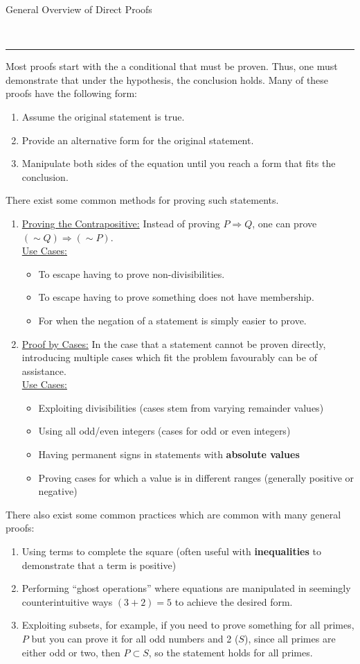 \documentclass{article}
\newcommand{\header}[1]{\begin{large}\noindent #1\end{large}\\\rule{\textwidth}{0.5pt}}
\newcommand{\sheader}[1]{\underline{#1:}}
\newcommand{\sgap}{\smallskip\\}
\begin{document}
\header{General Overview of Direct Proofs}
Most proofs start with the a conditional that must be proven. Thus, one must demonstrate that
under the hypothesis, the conclusion holds. Many of these proofs have the following form:
\begin{enumerate}
    \item Assume the original statement is true.
    \item Provide an alternative form for the original statement.
    \item Manipulate both sides of the equation until you reach a form that fits the conclusion.
\end{enumerate}

There exist some common methods for proving such 
statements.
\begin{enumerate}
    \item \sheader{Proving the Contrapositive} Instead of proving $P \Rightarrow Q$, one can 
    prove $(\sim Q) \Rightarrow (\sim P)$.
    \sgap
    \sheader{Use Cases}
    \begin{itemize}
        \item To escape having to prove non-divisibilities. 
        \item To escape having to prove something does not have membership.
        \item For when the negation of a statement is simply easier to prove.
    \end{itemize}
    \item \sheader{Proof by Cases} In the case that a statement cannot be proven directly,
    introducing multiple cases which fit the problem favourably can be of assistance.
    \sgap
    \sheader{Use Cases}
    \begin{itemize}
        \item Exploiting divisibilities (cases stem from varying remainder values)
        \item Using all odd/even integers (cases for odd or even integers)
        \item Having permanent signs in statements with \textbf{absolute values}
        \item Proving cases for which a value is in different ranges (generally positive or negative)
    \end{itemize}
\end{enumerate}

There also exist some common practices which are common with many general proofs:
\begin{enumerate}
    \item Using terms to complete the square (often useful with \textbf{inequalities} to demonstrate that a term is positive)
    \item Performing ``ghost operations'' where equations are manipulated in seemingly
    counterintuitive ways $(3 + 2) = 5$ to achieve the desired form.
    \item Exploiting subsets, for example, if you need to prove something for all primes, $P$
    but you can prove it for all odd numbers and 2 ($S$), since all primes are either odd or two,
    then $P \subset S$, so the statement holds for all primes.
\end{enumerate}
\end{document}
